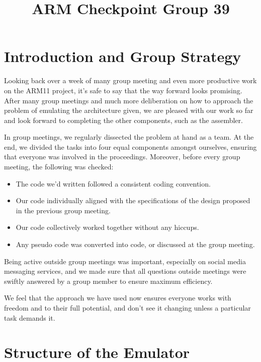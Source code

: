 \documentclass[11pt]{article}
\begin{document}
\title{ARM Checkpoint Group 39}

\maketitle

\section{Introduction and Group Strategy}

Looking back over a week of many group meeting and even more productive work on the ARM11 project, it’s safe to say that the way forward looks promising. After many group meetings and much more deliberation on how to approach the problem of emulating the architecture given, we are pleased with our work so far and look forward to completing the other components, such as the assembler.

In group meetings, we regularly dissected the problem at hand as a team. At the end, we divided the tasks into four equal components amongst ourselves, ensuring that everyone was involved in the proceedings. Moreover, before every group meeting, the following was checked:

\begin{itemize}

    \item The code we’d written followed a consistent coding convention.
    \item Our code individually aligned with the specifications of the design proposed in the previous group meeting.
    \item Our code collectively worked together without any hiccups.
    \item Any pseudo code was converted into code, or discussed at the group meeting.

\end{itemize}

Being active outside group meetings was important, especially on social media messaging services, and we made sure that all questions outside meetings were swiftly answered by a group member to ensure maximum efficiency. 

We feel that the approach we have used now ensures everyone works with freedom and to their full potential, and don’t see it changing unless a particular task demands it.

\section{Structure of the Emulator}
\end{document}

